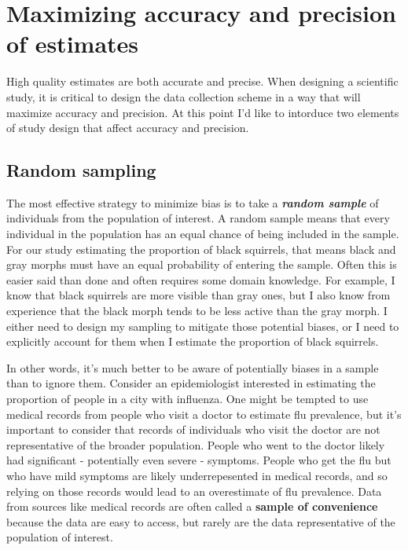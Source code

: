 \documentclass[
]{book}
\begin{document}
\section{Maximizing accuracy and precision of estimates}\label{maximizing-accuracy-and-precision-of-estimates}

High quality estimates are both accurate and precise. When designing a scientific study, it is critical to design the data collection scheme in a way that will maximize accuracy and precision. At this point I'd like to intorduce two elements of study design that affect accuracy and precision.

\subsection{Random sampling}\label{random-sampling}

The most effective strategy to minimize bias is to take a \textbf{\emph{random sample}} of individuals from the population of interest. A random sample means that every individual in the population has an equal chance of being included in the sample. For our study estimating the proportion of black squirrels, that means black and gray morphs must have an equal probability of entering the sample. Often this is easier said than done and often requires some domain knowledge. For example, I know that black squirrels are more visible than gray ones, but I also know from experience that the black morph tends to be less active than the gray morph. I either need to design my sampling to mitigate those potential biases, or I need to explicitly account for them when I estimate the proportion of black squirrels.

In other words, it's much better to be aware of potentially biases in a sample than to ignore them. Consider an epidemiologist interested in estimating the proportion of people in a city with influenza. One might be tempted to use medical records from people who visit a doctor to estimate flu prevalence, but it's important to consider that records of individuals who visit the doctor are not representative of the broader population. People who went to the doctor likely had significant - potentially even severe - symptoms. People who get the flu but who have mild symptoms are likely underrepesented in medical records, and so relying on those records would lead to an overestimate of flu prevalence. Data from sources like medical records are often called a \textbf{sample of convenience} because the data are easy to access, but rarely are the data representative of the population of interest.
\end{document}
